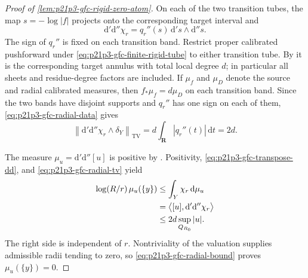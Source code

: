 \begin{proof}[Proof of \cref{lem:p21p3-gfc-rigid-zero-atom}]
On each of the two transition tubes, the map $s=-\log|f|$ projects onto
the corresponding target interval and
\begin{equation}
\label{eq:p21p3-gfc-radial-dd}
 \mathrm d'\mathrm d''\chi_r
   =q_r''(s)\,\mathrm d's\wedge\mathrm d''s .
\end{equation}
The sign of $q_r''$ is fixed on each transition band.  Restrict proper
calibrated pushforward under
\eqref{eq:p21p3-gfc-finite-rigid-tube} to either transition tube.  By
\cite[Proposition~14.4.2]{CLD25} it is the corresponding target annulus
with total local degree $d$; in particular all sheets and residue-degree
factors are included.  If $\mu_f$ and $\mu_D$ denote the source and radial
calibrated measures, then $f_*\mu_f=d\mu_D$ on each transition band.
Since the two bands have disjoint supports and $q_r''$ has one sign on
each of them, \eqref{eq:p21p3-gfc-radial-data} gives
\begin{equation}
\label{eq:p21p3-gfc-radial-tv}
 \left\|\mathrm d'\mathrm d''\chi_r\wedge\delta_Y\right\|_{\mathrm{TV}}
 =d\int_{\mathbf R}|q_r''(t)|\,\mathrm dt=2d.
\end{equation}

The measure $\mu_u=\mathrm d'\mathrm d''[u]$ is positive by
\cite[Lemma~8.5.5]{CLD25}.  Positivity,
\eqref{eq:p21p3-gfc-transpose-dd}, and
\eqref{eq:p21p3-gfc-radial-tv} yield
\begin{align}
 \log(R/r)\,\mu_u(\{y\})
 &\leq \int_Y\chi_r\,\mathrm d\mu_u                                      \notag\\
 &=\bigl\langle[u],\mathrm d'\mathrm d''\chi_r\bigr\rangle                \notag\\
 &\leq 2d\sup_{Q_{R_0}}|u|.
\label{eq:p21p3-gfc-radial-bound}
\end{align}
The right side is independent of $r$.  Nontriviality of the valuation
supplies admissible radii tending to zero, so
\eqref{eq:p21p3-gfc-radial-bound} proves $\mu_u(\{y\})=0$.
\end{proof}

